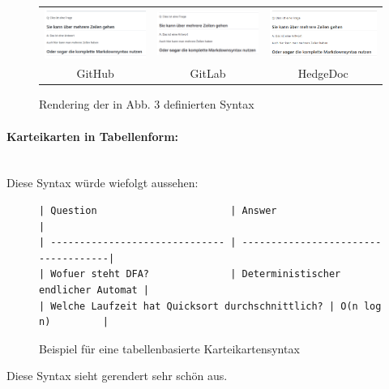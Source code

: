 \documentclass[ngerman]{article}
\begin{document}
\begin{figure}[H]
\centering
\begin{tabular}{ccc}
\includegraphics[width=50mm]{./figures/GH_Syntax2} & \includegraphics[width=50mm]{./figures/GL_Syntax2} & \includegraphics[width=50mm]{./figures/HD_Syntax2} \\
GitHub & GitLab & HedgeDoc \\
\end{tabular}
\caption{Rendering der in Abb. 3 definierten Syntax}
\end{figure}

\paragraph{Karteikarten in Tabellenform:}~\\
Diese Syntax würde wiefolgt aussehen:
\begin{figure}[H]
  \begin{lstlisting}
| Question                       | Answer                              |
| ------------------------------ | ------------------------------------|
| Wofuer steht DFA?              | Deterministischer endlicher Automat |
| Welche Laufzeit hat Quicksort durchschnittlich? | O(n log n)         |
\end{lstlisting}
  \caption{Beispiel für eine tabellenbasierte Karteikartensyntax}
\end{figure}

Diese Syntax sieht gerendert sehr schön aus.
\end{document}
